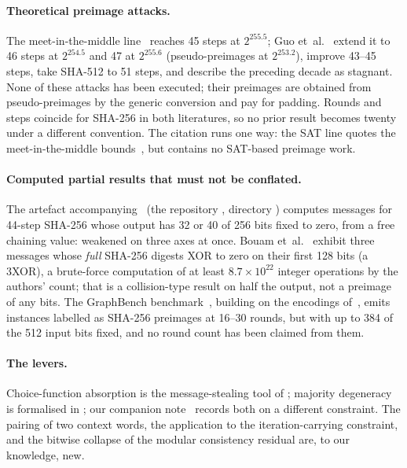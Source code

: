 \documentclass[11pt,a4paper]{article}
\begin{document}
\paragraph{Theoretical preimage attacks.}
The meet-in-the-middle line~\cite{IsobeShibutani2009,AokiGuo2009,KRS2012}
reaches 45 steps at $2^{255.5}$; Guo et~al.~\cite{GuoLiLiuWangZhang2026}
extend it to 46 steps at $2^{254.5}$ and 47 at $2^{255.6}$ (pseudo-preimages
at $2^{253.2}$), improve 43--45 steps, take SHA-512 to 51 steps, and describe
the preceding decade as stagnant.  None of these attacks has been executed;
their preimages are obtained from pseudo-preimages by the generic conversion
and pay for padding.  Rounds and steps coincide for SHA-256 in both
literatures, so no prior result becomes twenty under a different convention.
The citation runs one way: the SAT line quotes the meet-in-the-middle
bounds~\cite{Zaikin2026,Davydov2025}, but \cite{GuoLiLiuWangZhang2026}
contains no SAT-based preimage work.

\paragraph{Computed partial results that must not be conflated.}
The artefact accompanying~\cite{GuoLiLiuWangZhang2026}
(the repository ,
directory ) computes messages for 44-step
SHA-256 whose output has 32 or 40 of 256 bits fixed to zero, from a free
chaining value: weakened on three axes at once.  Bouam et~al.~\cite{Bouam2021} exhibit three messages whose \emph{full} SHA-256 digests XOR to zero on
their first 128 bits (a 3XOR), a brute-force computation of at least
$8.7\times10^{22}$ integer operations by the authors' count; that is a collision-type result on half the output, not a preimage
of any bits.  The GraphBench benchmark~\cite{Stoll2025}, building on the
encodings of~\cite{Nejati2017,Alamgir2024}, emits instances labelled as
SHA-256 preimages at 16--30 rounds, but with up to 384 of the 512 input bits
fixed, and no round count has been claimed from them.

\paragraph{The levers.}
Choice-function absorption is the message-stealing tool of
\cite{AokiGuo2009}; majority degeneracy is formalised in
\cite{GuoLiLiuWangZhang2026}; our companion note~\cite{Basra2026R20}
records both on a different constraint.  The pairing of two context words,
the application to the iteration-carrying constraint, and the bitwise
collapse of the modular consistency residual are, to our knowledge, new.
\end{document}
